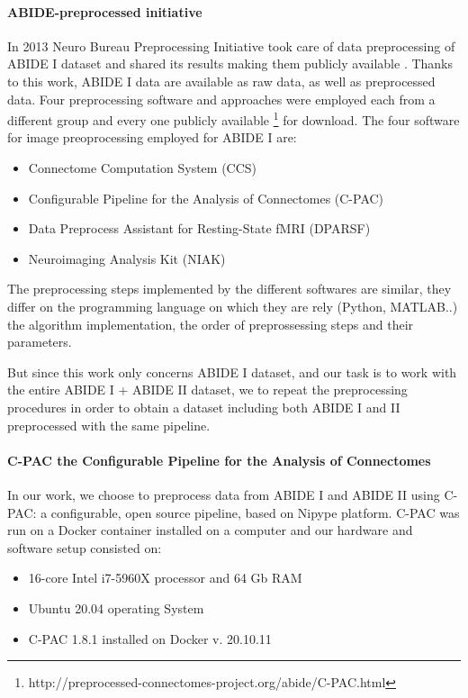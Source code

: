 \documentclass[11pt]{report}
\begin{document}
\paragraph{ABIDE-preprocessed initiative}\hfill

In 2013 Neuro Bureau Preprocessing Initiative took care of data preprocessing of ABIDE I dataset and shared its results making them publicly available \cite{cameron2013}.
Thanks to this work, ABIDE I data are available as raw data, as well as preprocessed data.
Four preprocessing software and approaches were employed each from a different group and every one publicly available \footnote{http://preprocessed-connectomes-project.org/abide/C-PAC.html} for download.
The four software for image preoprocessing employed for ABIDE I are:
\begin{itemize}
\item Connectome Computation System (CCS)
\item Configurable Pipeline for the Analysis of Connectomes (C-PAC)
\item Data Preprocess Assistant for Resting-State fMRI (DPARSF)
\item Neuroimaging Analysis Kit (NIAK)
\end{itemize}
The preprocessing steps implemented by the different softwares are similar, they differ on the programming language on which they are rely (Python, MATLAB..) the algorithm implementation, the order of preprossessing steps and their parameters.

But since this work only concerns ABIDE I dataset, and our task is to work with the entire ABIDE I + ABIDE II dataset, we to repeat the preprocessing procedures in order to obtain a dataset including both ABIDE I and II preprocessed with the same pipeline.

\paragraph{C-PAC the Configurable Pipeline for the Analysis of Connectomes}\hfill

In our work, we choose to preprocess data from ABIDE I and ABIDE II using C-PAC: a configurable, open source pipeline, based on Nipype platform.
C-PAC was run on a Docker container installed on a computer and our hardware and software setup consisted on:
\begin{itemize}
\item 16-core Intel i7-5960X processor and 64 Gb RAM
\item Ubuntu 20.04 operating System
\item C-PAC 1.8.1 installed on Docker v. 20.10.11
\end{itemize}
\end{document}
